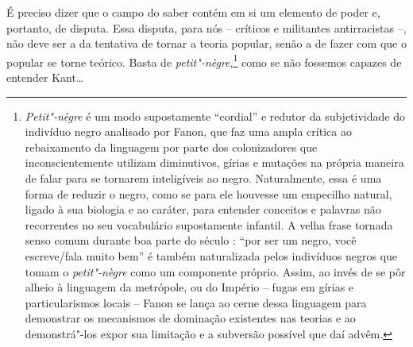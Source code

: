 É preciso dizer que o campo do saber contém em si um elemento de poder
e, portanto, de disputa. Essa disputa, para nós -- críticos e militantes
antirracistas --, não deve ser a da tentativa de tornar a teoria
popular, senão a de fazer com que o popular se torne teórico. Basta de
\emph{petit"-nègre},\footnote{\emph{Petit"-nègre} é um modo supostamente
  ``cordial'' e redutor da subjetividade do indivíduo negro analisado
  por Fanon, que faz uma ampla crítica ao rebaixamento da linguagem por
  parte dos colonizadores que inconscientemente utilizam diminutivos,
  gírias e mutações na própria maneira de falar para se tornarem
  inteligíveis ao negro. Naturalmente, essa é uma forma de reduzir o
  negro, como se para ele houvesse um empecilho natural, ligado à sua
  biologia e ao caráter, para entender conceitos e palavras não
  recorrentes no seu vocabulário supostamente infantil. A velha frase
  tornada senso comum durante boa parte do século : ``por ser um
  negro, você escreve/fala muito bem'' é também naturalizada pelos
  indivíduos negros que tomam o \emph{petit"-nègre} como um componente
  próprio. Assim, ao invés de se pôr alheio à linguagem da metrópole, ou
  do Império -- fugas em gírias e particularismos locais -- Fanon se
  lança ao cerne dessa linguagem para demonstrar os mecanismos de
  dominação existentes nas teorias e ao demonstrá"-los expor sua
  limitação e a subversão possível que daí advêm.} como se não fossemos
capazes de entender Kant\ldots{}

